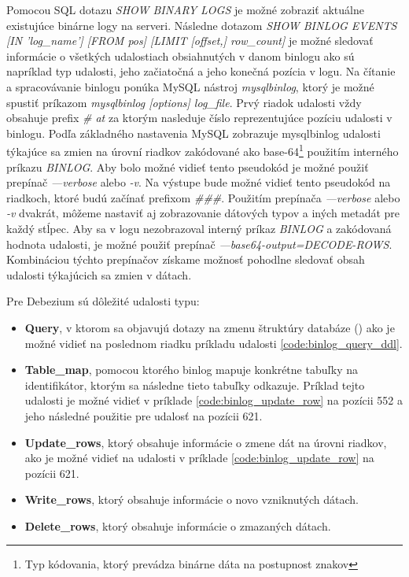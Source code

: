 Pomocou SQL dotazu \textit{SHOW BINARY LOGS} je možné zobraziť aktuálne existujúce binárne logy na serveri. Následne dotazom \textit{SHOW BINLOG EVENTS [IN 'log\_name']  [FROM pos] [LIMIT [offset,] row\_count]} je možné sledovať informácie o všetkých udalostiach obsiahnutých v danom binlogu ako sú napríklad typ udalosti, jeho začiatočná a jeho konečná pozícia v logu. Na čítanie a spracovávanie binlogu ponúka MySQL nástroj \textit{mysqlbinlog}, ktorý je možné spustiť príkazom \textit{mysqlbinlog [options] log\_file}. Prvý riadok udalosti vždy obsahuje prefix \textit{\# at} za ktorým nasleduje číslo reprezentujúce pozíciu udalosti v binlogu. Podľa základného nastavenia MySQL zobrazuje mysqlbinlog udalosti týkajúce sa zmien na úrovní riadkov zakódované ako base-64\footnote{Typ kódovania, ktorý prevádza binárne dáta na postupnost znakov} použitím interného príkazu \textit{BINLOG}. Aby bolo možné vidieť tento pseudokód je možné použiť prepínač \textit{---verbose} alebo \textit{-v}. Na výstupe bude možné vidieť tento pseudokód na riadkoch, ktoré budú začínať prefixom  \textit{\#\#\#}. Použitím prepínača \textit{---verbose} alebo \textit{-v} dvakrát, môžeme nastaviť aj zobrazovanie dátových typov a iných metadát pre každý stĺpec. Aby sa v logu nezobrazoval interný príkaz \textit{BINLOG} a zakódovaná hodnota udalosti, je možné použiť prepínač \textit{---base64-output=DECODE-ROWS}. Kombináciou týchto prepínačov získame možnosť pohodlne sledovať obsah udalosti týkajúcich sa zmien v dátach. \cite{mysql:reference_manual}

Pre Debezium sú dôležité udalosti typu:
\begin{itemize}
\item \textbf{Query}, v ktorom sa objavujú dotazy na zmenu štruktúry databáze () ako je možné vidieť na poslednom riadku príkladu udalosti \ref{code:binlog_query_ddl}.
\item \textbf{Table\_map}, pomocou ktorého binlog mapuje konkrétne tabuľky na identifikátor, ktorým sa následne tieto tabuľky odkazuje. Príklad tejto udalosti je možné vidieť v príklade \ref{code:binlog_update_row} na pozícii 552 a jeho následné použitie pre udalosť na pozícii 621. 
\item \textbf{Update\_rows}, ktorý obsahuje informácie o zmene dát na úrovni riadkov, ako je možné vidieť na udalosti v príklade \ref{code:binlog_update_row} na pozícii 621.
\item \textbf{Write\_rows}, ktorý obsahuje informácie o novo vzniknutých dátach.
\item \textbf{Delete\_rows}, ktorý obsahuje informácie o zmazaných dátach.
\end{itemize}


